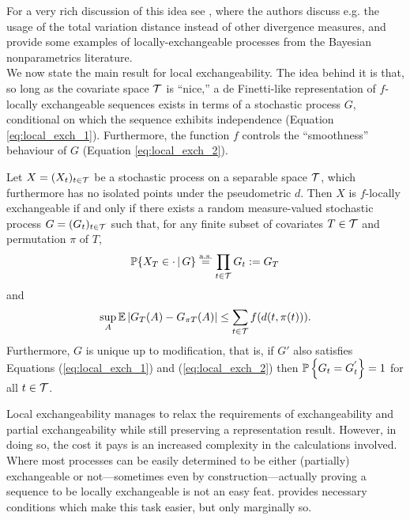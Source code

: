 For a very rich discussion of this idea see \cite{CampbellEtAl:2019:LocalExch}, where the authors discuss e.g. the usage of the total variation distance instead of other divergence measures, and provide some examples of locally-exchangeable processes from the Bayesian nonparametrics literature. \\



We now state the main result for local exchangeability. The idea behind it is that, so long as the covariate space $\mathcal{T}$ is ``nice,'' a de Finetti-like representation of $f$-locally exchangeable sequences exists in terms of a stochastic process $G$, conditional on which the sequence exhibits independence (Equation \ref{eq:local_exch_1}). Furthermore, the function $f$ controls the ``smoothness'' behaviour of $G$ (Equation \ref{eq:local_exch_2}). 

\begin{theorem}[Campbell et al. (2019)] \label{thm:de_finetti_local}
	Let $X = (X_t)_{t \in \mathcal{T}}$ be a stochastic process on a separable space $\mathcal{T}$, which furthermore has no isolated points under the pseudometric $d$. Then $X$ is $f$-locally exchangeable if and only if there exists a random measure-valued stochastic process $G = (G_t)_{t \in \mathcal{T}}$ such that, for any finite subset of covariates $T \in \mathcal{T}$ and permutation $\pi$ of $T$,
	\begin{equation} \label{eq:local_exch_1}
		\mathbb{P} \{ X_T \in \cdot \, | \, G \} \overset{\mathrm{a.s.}}{=} \prod_{t \in \mathcal{T}} G_t := G_T
	\end{equation}
	and
	\begin{equation} \label{eq:local_exch_2}
		\sup_{A} \mathbb{E} \left| G_T(A) - G_{\pi T} (A) \right| \leq \sum_{t \in \mathcal{T}} f(d(t, \pi(t))).
	\end{equation}
	Furthermore, $G$ is unique up to modification, that is, if $G'$ also satisfies Equations (\ref{eq:local_exch_1}) and (\ref{eq:local_exch_2}) then $\mathbb{P} \left\{ G_t = G_t^{'} \right\} = 1$ for all $t \in \mathcal{T}$.
\end{theorem}


Local exchangeability manages to relax the requirements of exchangeability and partial exchangeability while still preserving a representation result. However, in doing so, the cost it pays is an increased complexity in the calculations involved. Where most processes can be easily determined to be either (partially) exchangeable or not---sometimes even by construction---actually proving a sequence to be locally exchangeable is not an easy feat. \cite[][Proposition 3]{CampbellEtAl:2019:LocalExch} provides necessary conditions which make this task easier, but only marginally so. 



